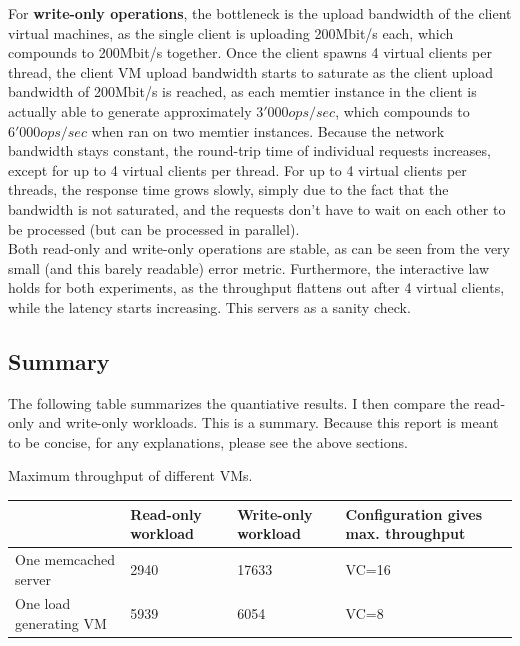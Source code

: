 \documentclass[11pt,a4paper]{article}
\begin{document}
For \textbf{write-only operations}, the bottleneck is the upload bandwidth of the client virtual machines, as the single client is uploading 200Mbit/s each, which compounds to 200Mbit/s together.
Once the client spawns 4 virtual clients per thread, the client VM upload bandwidth starts to saturate as the client upload bandwidth of 200Mbit/s is reached, as each memtier instance in the client is actually able to generate approximately $3'000 ops/sec$, which compounds to $6'000 ops/sec$ when ran on two memtier instances.
Because the network bandwidth stays constant, the round-trip time of individual requests increases, except for up to 4 virtual clients per thread.
For up to 4 virtual clients per threads, the response time grows slowly, simply due to the fact that the bandwidth is not saturated, and the requests don't have to wait on each other to be processed (but can be processed in parallel).\\

Both read-only and write-only operations are stable, as can be seen from the very small (and this barely readable) error metric.
Furthermore, the interactive law holds for both experiments, as the throughput flattens out after 4 virtual clients, while the latency starts increasing.
This servers as a sanity check. \\


\subsection{Summary}

The following table summarizes the quantiative results. I then compare the read-only and write-only workloads.
This is a summary. 
Because this report is meant to be concise, for any explanations, please see the above sections.

\begin{center}
	{Maximum throughput of different VMs.}
	\begin{tabular}{|l|p{2cm}|p{2cm}|p{4cm}|}
		\hline                        & Read-only workload & Write-only workload & Configuration gives max. throughput \\ 
		\hline One memcached server   & 2940 & 17633 & VC=16  \\ 
		\hline One load generating VM & 5939 & 6054 & VC=8 \\ 
		\hline 
	\end{tabular}
\end{center}
\end{document}
